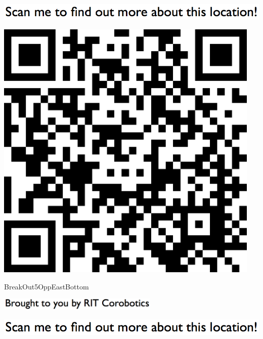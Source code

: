 \documentclass[letterpaper]{article}
\begin{document}
 
 \vspace*{\fill} 
 
  \centerline{\includegraphics[scale=1,width=6in]{text-top.png}} 
 
 \vspace{0.5in} 
 
 \begingroup 
 \centerline{\includegraphics[scale=1,width=5in,height=5in]{BreakOut5OppEastBottom.png}} 
 \endgroup 
 \vspace*{\fill} 

 \hfill{\small BreakOut5OppEastBottom} 

  \vspace{0.7in} 
 
 \centerline{\includegraphics[scale=1,width=3in]{text-bottom.png}} 
 
 \pagebreak 
{} 
 \vspace*{\fill} 
 
  \centerline{\includegraphics[scale=1,width=6in]{text-top.png}} 
 
\end{document}
